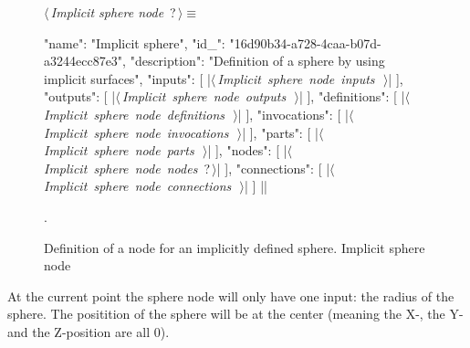 \documentclass[%
    a4paper,    %
    justified,  %
    nobib,      %
    openany     %
]{tufte-book}
\makeatletter
\renewcommand{\label}[1]{\@tufte@label{##1}}%
\makeatother
\begin{document}
\begin{figure}
\begin{flushleft} \small
\begin{minipage}{\linewidth}\label{scrap99}\raggedright\small
{} $\langle\,${\itshape Implicit sphere node}\nobreak\ {\footnotesize {?}}$\,\rangle\equiv$
\vspace{-1ex}
\begin{pythoncode}
{
    "name": "Implicit sphere",
    "id_": "16d90b34-a728-4caa-b07d-a3244ecc87e3",
    "description": "Definition of a sphere by using implicit surfaces",
    "inputs": [
        |\hbox{$\langle\,${\itshape Implicit sphere node inputs}\nobreak\ {\footnotesize {}}$\,\rangle$}|
    ],
    "outputs": [
        |\hbox{$\langle\,${\itshape Implicit sphere node outputs}\nobreak\ {\footnotesize {}}$\,\rangle$}|
    ],
    "definitions": [
        |\hbox{$\langle\,${\itshape Implicit sphere node definitions}\nobreak\ {\footnotesize {}}$\,\rangle$}|
    ],
    "invocations": [
        |\hbox{$\langle\,${\itshape Implicit sphere node invocations}\nobreak\ {\footnotesize {}}$\,\rangle$}|
    ],
    "parts": [
        |\hbox{$\langle\,${\itshape Implicit sphere node parts}\nobreak\ {\footnotesize {}}$\,\rangle$}|
    ],
    "nodes": [
        |\hbox{$\langle\,${\itshape Implicit sphere node nodes}\nobreak\ {\footnotesize ?}$\,\rangle$}|
    ],
    "connections": [
        |\hbox{$\langle\,${\itshape Implicit sphere node connections}\nobreak\ {\footnotesize {}}$\,\rangle$}|
    ]
}|\NWsep|
\end{pythoncode}
\vspace{1.5ex}
\footnotesize
\begin{list}{}{\setlength{\itemsep}{-\parsep}\setlength{\itemindent}{-\leftmargin}}
\item {\NWtxtMacroNoRef}.

\item{}
\end{list}
\end{minipage}\vspace{4ex}
\end{flushleft}
\caption{Definition of a node for an implicitly defined sphere.
  \newline{}\newline{}Implicit sphere node}
\label{editor:lst:nodes:sphere-node}
\end{figure}

At the current point the sphere node will only have one input: the radius of
the sphere. The positition of the sphere will be at the center (meaning the
X-, the Y- and the Z-position are all 0).
\end{document}
